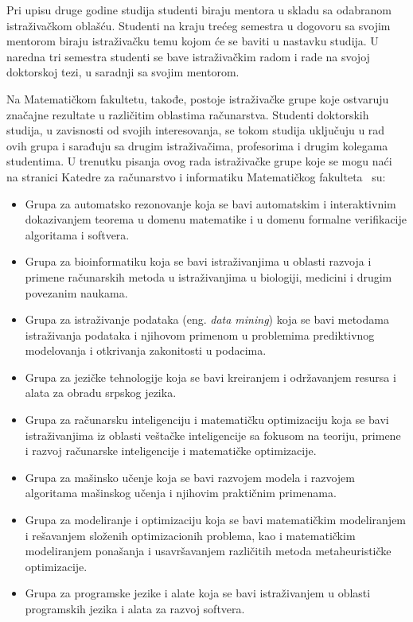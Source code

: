 \documentclass[a4paper]{article}
\begin{document}
Pri upisu druge godine studija studenti biraju mentora u skladu sa odabranom istraživačkom oblašću. Studenti na kraju trećeg semestra u dogovoru sa svojim mentorom biraju istraživačku temu kojom će se baviti u nastavku studija. U naredna tri semestra studenti se bave istraživačkim radom i rade na svojoj doktorskoj tezi, u saradnji sa svojim mentorom. 

Na Matematičkom fakultetu, takođe, postoje istraživačke grupe koje ostvaruju značajne rezultate u različitim oblastima računarstva. Studenti doktorskih studija, u zavisnosti od svojih interesovanja, se tokom studija uključuju u rad ovih grupa i sarađuju sa drugim istraživačima, profesorima i drugim kolegama studentima. U trenutku pisanja ovog rada istraživačke grupe koje se mogu naći na stranici Katedre za računarstvo i informatiku Matematičkog fakulteta \cite{katedraweb} su:

\begin{itemize}
\item Grupa za automatsko rezonovanje koja se bavi automatskim i interaktivnim dokazivanjem teorema u domenu matematike i u domenu formalne verifikacije algoritama i softvera.
\item Grupa za bioinformatiku koja se bavi istraživanjima u oblasti razvoja i primene računarskih metoda u istraživanjima u biologiji, medicini i drugim povezanim naukama.
\item Grupa za istraživanje podataka (eng. \emph{data mining}) koja se bavi metodama istraživanja podataka i njihovom primenom u problemima prediktivnog modelovanja i otkrivanja zakonitosti u podacima.
\item Grupa za jezičke tehnologije koja se bavi kreiranjem i održavanjem resursa i alata za obradu srpskog jezika.
\item Grupa za računarsku inteligenciju i matematičku optimizaciju koja se bavi istraživanjima iz oblasti veštačke inteligencije sa fokusom na teoriju, primene i razvoj računarske inteligencije i matematičke optimizacije.
\item Grupa za mašinsko učenje koja se bavi razvojem modela i razvojem algoritama mašinskog učenja i njihovim praktičnim primenama.
\item Grupa za modeliranje i optimizaciju koja se bavi matematičkim modeliranjem i rešavanjem složenih optimizacionih problema, kao i matematičkim modeliranjem ponašanja i usavršavanjem različitih metoda metaheurističke optimizacije.
\item Grupa za programske jezike i alate koja se bavi istraživanjem u oblasti programskih jezika i alata za razvoj softvera.
\end{itemize}
\end{document}
